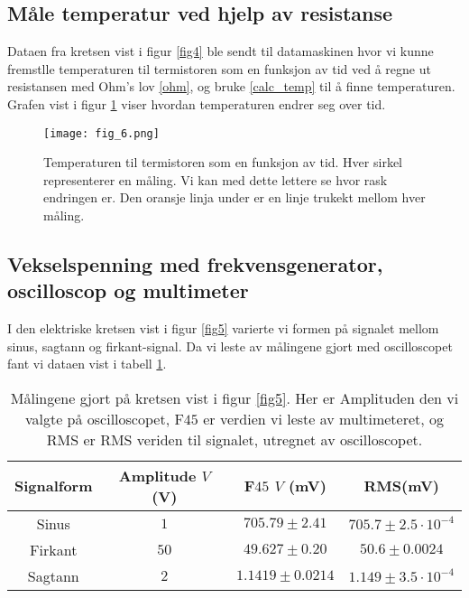 \documentclass[%
 reprint,
 amsmath,amssymb,
 aps,
]{revtex4-1}
\begin{document}
\subsection{Måle temperatur ved hjelp av resistanse}
Dataen fra kretsen vist i figur \ref{fig4} ble sendt til datamaskinen hvor vi kunne fremstlle temperaturen til termistoren som en funksjon av tid ved å regne ut resistansen med Ohm's lov \eqref{ohm}, og bruke \eqref{calc_temp} til å finne temperaturen. Grafen vist i figur \ref{fig6} viser hvordan temperaturen endrer seg over tid.
\begin{figure}[h!]
  \centering
  \texttt{[image: fig\_6.png]}
  \caption{Temperaturen til termistoren som en funksjon av tid. Hver sirkel representerer en måling. Vi kan med dette lettere se hvor rask endringen er. Den oransje linja under er en linje trukekt mellom hver måling.}
  \label{fig6}
\end{figure}

\subsection{Vekselspenning med frekvensgenerator, oscilloscop og multimeter}
I den elektriske kretsen vist i figur \ref{fig5} varierte vi formen på signalet mellom sinus, sagtann og firkant-signal. Da vi leste av målingene gjort med oscilloscopet fant vi dataen vist i tabell \ref{table5}.
\begin{table}[h!]
\centering
\caption{Målingene gjort på kretsen vist i figur \ref{fig5}. Her er Amplituden den vi valgte på oscilloscopet, F$45$ er verdien vi leste av multimeteret, og RMS er RMS veriden til signalet, utregnet av oscilloscopet.}
\label{table5}
\begin{tabular}{c c c c}
\toprule
    Signalform & Amplitude $V$ (V) & F$45$ $V$ (mV)  & RMS(mV) \\ \hline
 Sinus   &    $1$  &                  $705.79 \pm 2.41$ &      $705.7 \pm 2.5 \cdot 10^{-4}$ \\
 Firkant &   $ 50$ &                  $49.627 \pm 0.20$ &      $50.6 \pm 0.0024$\\
 Sagtann &    $2$  &                  $1.1419 \pm 0.0214$ &    $1.149 \pm 3.5 \cdot 10^{-4}  $ \\
\end{tabular}
\end{table}
\end{document}
